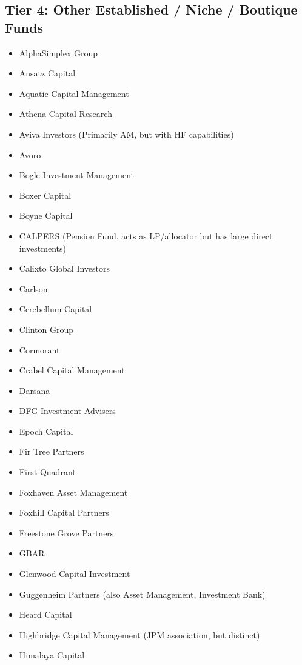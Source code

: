 \documentclass[11pt,a4paper]{article}
\begin{document}
\subsection*{Tier 4: Other Established / Niche / Boutique Funds}
\begin{multicols}{3}
\begin{itemize}[label=\textbullet, leftmargin=*, itemsep=1pt, parsep=0pt]
    \item AlphaSimplex Group
    \item Ansatz Capital
    \item Aquatic Capital Management
    \item Athena Capital Research
    \item Aviva Investors (Primarily AM, but with HF capabilities)
    \item Avoro
    \item Bogle Investment Management
    \item Boxer Capital
    \item Boyne Capital
    \item CALPERS (Pension Fund, acts as LP/allocator but has large direct investments)
    \item Calixto Global Investors
    \item Carlson
    \item Cerebellum Capital
    \item Clinton Group
    \item Cormorant
    \item Crabel Capital Management
    \item Darsana
    \item DFG Investment Advisers
    \item Epoch Capital
    \item Fir Tree Partners
    \item First Quadrant
    \item Foxhaven Asset Management
    \item Foxhill Capital Partners
    \item Freestone Grove Partners
    \item GBAR
    \item Glenwood Capital Investment
    \item Guggenheim Partners (also Asset Management, Investment Bank)
    \item Heard Capital
    \item Highbridge Capital Management (JPM association, but distinct)
    \item Himalaya Capital

\end{itemize}
\end{multicols}
\end{document}
